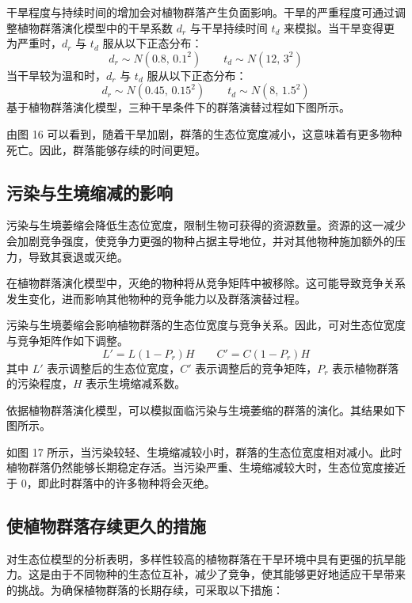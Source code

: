 \documentclass[11pt,a4paper]{ctexart}
\begin{document}
干旱程度与持续时间的增加会对植物群落产生负面影响。干旱的严重程度可通过调整植物群落演化模型中的干旱系数 $d_r$ 与干旱持续时间 $t_d$ 来模拟。当干旱变得更为严重时，$d_r$ 与 $t_d$ 服从以下正态分布：
\begin{equation}
d_r\sim N\left(0.8,\,0.1^2\right)\qquad t_d\sim N\left(12,\,3^2\right)
\end{equation}
当干旱较为温和时，$d_r$ 与 $t_d$ 服从以下正态分布：
\begin{equation}
d_r\sim N\left(0.45,\,0.15^2\right)\qquad t_d\sim N\left(8,\,1.5^2\right)
\end{equation}
基于植物群落演化模型，三种干旱条件下的群落演替过程如下图所示。

由图 16 可以看到，随着干旱加剧，群落的生态位宽度减小，这意味着有更多物种死亡。因此，群落能够存续的时间更短。

\subsection{污染与生境缩减的影响}

污染与生境萎缩会降低生态位宽度，限制生物可获得的资源数量。资源的这一减少会加剧竞争强度，使竞争力更强的物种占据主导地位，并对其他物种施加额外的压力，导致其衰退或灭绝。

在植物群落演化模型中，灭绝的物种将从竞争矩阵中被移除。这可能导致竞争关系发生变化，进而影响其他物种的竞争能力以及群落演替过程。

污染与生境萎缩会影响植物群落的生态位宽度与竞争关系。因此，可对生态位宽度与竞争矩阵作如下调整。
\begin{equation}
L'=L(1-P_r)H\qquad C'=C(1-P_r)H
\end{equation}
其中 $L'$ 表示调整后的生态位宽度，$C'$ 表示调整后的竞争矩阵，$P_r$ 表示植物群落的污染程度，$H$ 表示生境缩减系数。

依据植物群落演化模型，可以模拟面临污染与生境萎缩的群落的演化。其结果如下图所示。

如图 17 所示，当污染较轻、生境缩减较小时，群落的生态位宽度相对减小。此时植物群落仍然能够长期稳定存活。当污染严重、生境缩减较大时，生态位宽度接近于 0，即此时群落中的许多物种将会灭绝。

\subsection{使植物群落存续更久的措施}

对生态位模型的分析表明，多样性较高的植物群落在干旱环境中具有更强的抗旱能力。这是由于不同物种的生态位互补，减少了竞争，使其能够更好地适应干旱带来的挑战。为确保植物群落的长期存续，可采取以下措施：
\end{document}
